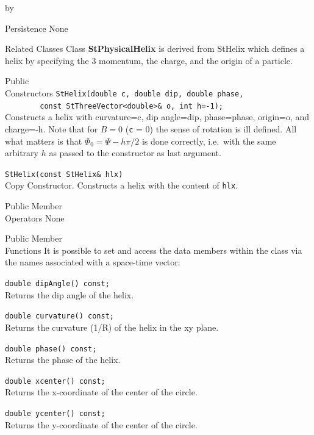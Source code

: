 \documentclass[twoside]{article}
\newcommand{\comp}[1]{\texttt{#1}}%
\newcommand{\entrylabel}[1]{\mbox{\textbf{{#1}}}\hfil}%
\newenvironment{entry}
{\begin{list}{}%
    {\renewcommand{\makelabel}{\entrylabel}%
     \setlength{\labelwidth}{90pt}%
     \setlength{\leftmargin}{\labelwidth}
     \advance\leftmargin by \labelsep%
      }%
    }%
  {\end{list}}
\newcommand{\Entrylabel}[1]%
{\raisebox{0pt}[1ex][0pt]{\makebox[\labelwidth][l]%
    {\parbox[t]{\labelwidth}{\hspace{0pt}\textbf{{#1}}}}}}
\newenvironment{Entry}%
{\renewcommand{\entrylabel}{\Entrylabel}\begin{entry}}%
  {\end{entry}}
\begin{document}
\begin{Entry}
    
\item[Persistence]
    None

\item[Related Classes]
    Class {\bf StPhysicalHelix} is derived from StHelix
    which defines a helix by specifying the 3 momentum, the charge, and
    the origin of a particle.

\item[Public\\ Constructors]
    \verb+StHelix(double c, double dip, double phase,+\\
    \verb+        const StThreeVector<double>& o, int h=-1);+ \\
    Constructs a helix with curvature=c, dip angle=dip, phase=phase,
    origin=o, and charge=-h.
    Note that for $B = 0$ (\texttt{c} = 0) the sense of rotation is ill defined.
    All what matters is that $\Phi_0 = \Psi - h \pi/2$ is done correctly,
    i.e.~with the same arbitrary $h$ as passed to the constructor as last
    argument. 
    
    \verb+StHelix(const StHelix& hlx)+\\
    Copy Constructor. Constructs a helix with the content of \comp{hlx}.
        
\item[Public Member\\ Operators]
    None
  
\item[Public Member\\ Functions]
    It is possible to set and access the data members within the class
    via the names associated with a space-time vector:
  
    \verb+double dipAngle() const;+\\
    Returns the dip angle of the helix.
    
    \verb+double curvature() const;+\\
    Returns the curvature (1/R) of the helix in the xy plane.

    \verb+double phase() const;+\\
    Returns the phase of the helix.
    
    \verb+double xcenter() const;+\\
    Returns the x-coordinate of the center of the circle.

    \verb+double ycenter() const;+\\
    Returns the y-coordinate of the center of the circle.


\end{Entry}
\end{document}
